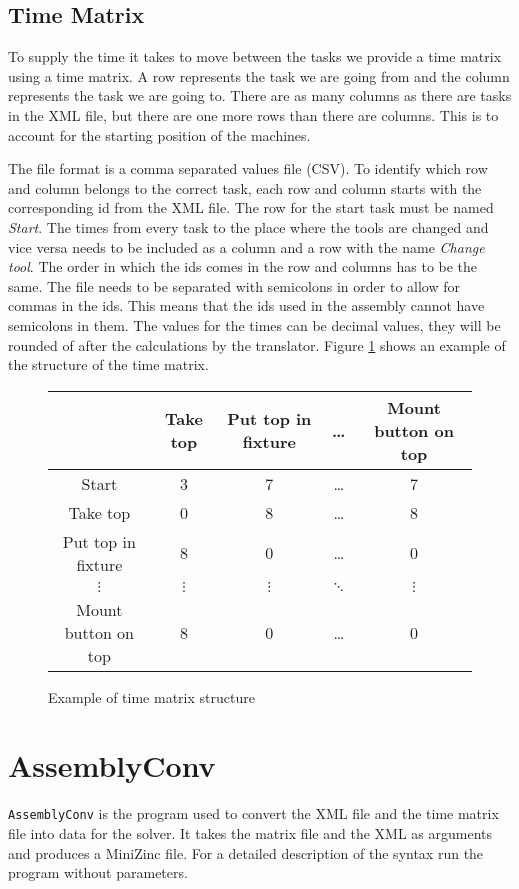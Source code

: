 \subsection{Time Matrix}\label{sec:time_matrix}
To supply the time it takes to move between the tasks we provide a time matrix using a time matrix. A row represents the task we are going from and the column represents the task we are going to. There are as many columns as there are tasks in the XML file, but there are one more rows than there are columns. This is to account for the starting position of the machines.

The file format is a comma separated values file (CSV). To identify which row and column belongs to the correct task, each row and column starts with the corresponding id from the XML file. The row for the start task must be named \emph{Start}. The times from every task to the place where the tools are changed and vice versa needs to be included as a column and a row with the name \emph{Change tool}. The order in which the ids comes in the row and columns has to be the same. The file needs to be separated with semicolons in order to allow for commas in the ids. This means that the ids used in the assembly cannot have semicolons in them. The values for the times can be decimal values, they will be rounded of after the calculations by the translator. Figure \ref{fig:time_matrix} shows an example of the structure of the time matrix.

\begin{figure}[h]
\begin{tabular}{c|c|c|c|c}
& Take top & Put top in fixture & \dots & Mount button on top\\\hline
Start & 3 & 7 & \dots & 7\\\hline
Take top & 0 & 8 & \dots & 8\\\hline
Put top in fixture & 8 & 0 & \dots & 0\\\hline
$\vdots$ & $\vdots$ & $\vdots$ & $\ddots$ & $\vdots$\\\hline
Mount button on top & 8 & 0 & \dots & 0
\end{tabular}
\caption{Example of time matrix structure}
\label{fig:time_matrix}
\end{figure}

\section{AssemblyConv}\label{sec:assemblyConv}
\texttt{AssemblyConv} is the program used to convert the XML file and the time matrix file into data for the solver. It takes the matrix file and the XML as arguments and produces a MiniZinc file. For a detailed description of the syntax run the program without parameters.

